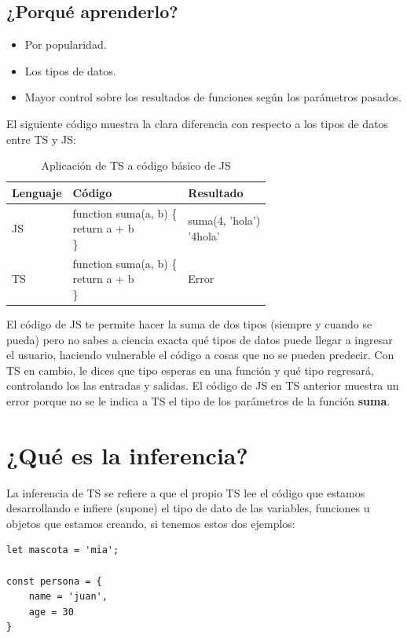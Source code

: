 \subsection{¿Porqué aprenderlo?}

\begin{itemize}
    \item Por popularidad.
    \item Los tipos de datos.
    \item Mayor control sobre los resultados de funciones según los parámetros pasados.
\end{itemize}

El siguiente código muestra la clara diferencia con respecto a los tipos de datos entre TS y JS:
\begin{table}[H]
    \centering
    \caption{Aplicación de TS a código básico de JS}
    \label{tab:2}
    \begin{tabular}{|m{4cm}|m{6cm}|m{4cm}|}
        \hline
        \textbf{Lenguaje} & \textbf{Código} & \textbf{Resultado} \\
        \hline
        JS & \parbox{6cm}{function suma(a, b) \{ \\ return a + b \\ \}} & \parbox{4cm}{suma(4, 'hola') \\ '4hola'} \\
        \hline
        TS & \parbox{6cm}{function suma(a, b) \{ \\ return a + b \\ \}} & Error \\
        \hline
    \end{tabular}
\end{table}

El código de JS te permite hacer la suma de dos tipos (siempre y cuando se pueda) pero no sabes a ciencia exacta qué tipos de datos puede llegar a ingresar el usuario, haciendo vulnerable el código a cosas que no se pueden predecir. Con TS en cambio, le dices que tipo esperas en una función y qué tipo regresará, controlando los las entradas y salidas. El código de JS en TS anterior muestra un error porque no se le indica a TS el tipo de los parámetros de la función \textbf{suma}.



\section{¿Qué es la inferencia?}

La inferencia de TS se refiere a que el propio TS lee el código que estamos desarrollando e infiere (supone) el tipo de dato de las variables, funciones u objetos que estamos creando, si tenemos estos dos ejemplos:
\begin{lstlisting}
let mascota = 'mia';

const persona = {
    name = 'juan',
    age = 30
}
\end{lstlisting}

